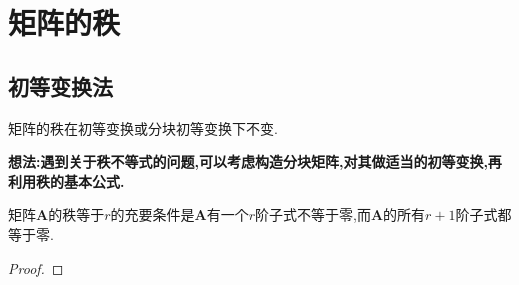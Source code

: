 \documentclass[../../main.tex]{subfiles}%
\begin{document}
\everymath{\displaystyle} %

\section{矩阵的秩}

\subsection{初等变换法}

矩阵的秩在初等变换或分块初等变换下不变.

\textbf{想法:遇到关于秩不等式的问题,可以考虑构造分块矩阵,对其做适当的初等变换,再利用秩的基本公式.}

\begin{theorem}\label{theorem:矩阵的秩与子式}
矩阵\(\boldsymbol{A}\)的秩等于\(r\)的充要条件是\(\boldsymbol{A}\)有一个\(r\)阶子式不等于零,而\(\boldsymbol{A}\)的所有\(r + 1\)阶子式都等于零.
\end{theorem}
\begin{proof}



\end{proof}
\end{document}
